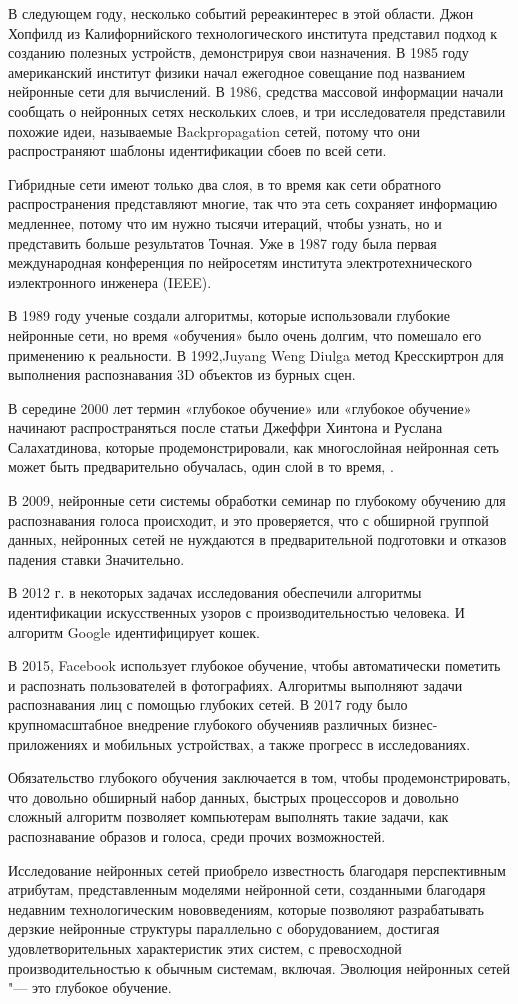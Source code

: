 В следующем году, несколько событий ререакинтерес в этой области.
Джон Хопфилд из Калифорнийского технологического института представил подход к созданию полезных устройств,
демонстрируя свои назначения. В 1985 году американский институт физики начал ежегодное совещание под названием нейронные сети для вычислений.
В 1986, средства массовой информации начали сообщать о нейронных сетях нескольких слоев, и три исследователя представили похожие идеи,
называемые Backpropagation сетей, потому что они распространяют шаблоны идентификации сбоев по всей сети.

Гибридные сети имеют только два слоя, в то время как сети обратного распространения представляют многие,
так что эта сеть сохраняет информацию медленнее, потому что им нужно тысячи итераций, чтобы узнать,
но и представить больше результатов Точная. Уже в 1987 году была первая международная конференция
по нейросетям института электротехнического иэлектронного инженера (IEEE).

В 1989 году ученые создали алгоритмы, которые использовали глубокие нейронные сети,
но время «обучения» было очень долгим,
что помешало его применению к реальности.
В 1992,Juyang Weng Diulga метод Кресскиртрон
для выполнения распознавания 3D объектов из бурных сцен.

В середине 2000 лет термин «глубокое обучение» или «глубокое обучение»
начинают распространяться после статьи Джеффри Хинтона и Руслана Салахатдинова,
которые продемонстрировали, как многослойная нейронная сеть
может быть предварительно обучалась, один слой в то время, .

В 2009, нейронные сети системы обработки семинар по глубокому обучению для распознавания голоса происходит, и это проверяется,
что с обширной группой данных, нейронных сетей не нуждаются в предварительной подготовки и отказов падения ставки Значительно.

В 2012 г. в некоторых задачах исследования обеспечили алгоритмы идентификации
искусственных узоров с производительностью человека.
И алгоритм Google идентифицирует кошек.

В 2015, Facebook использует глубокое обучение,
чтобы автоматически пометить и распознать пользователей в фотографиях.
Алгоритмы выполняют задачи распознавания лиц с помощью глубоких сетей.
В 2017 году было крупномасштабное внедрение глубокого обученияв различных
бизнес-приложениях и мобильных устройствах, а также прогресс в исследованиях.

Обязательство глубокого обучения заключается в том,
чтобы продемонстрировать, что довольно обширный набор данных,
быстрых процессоров и довольно сложный алгоритм позволяет компьютерам выполнять такие задачи,
как распознавание образов и голоса, среди прочих возможностей.

Исследование нейронных сетей приобрело известность благодаря перспективным атрибутам,
представленным моделями нейронной сети, созданными благодаря недавним технологическим нововведениям,
которые позволяют разрабатывать дерзкие нейронные структуры параллельно с оборудованием,
достигая удовлетворительных характеристик этих систем,
с превосходной производительностью к обычным системам,
включая. Эволюция нейронных сетей "--- это глубокое обучение.